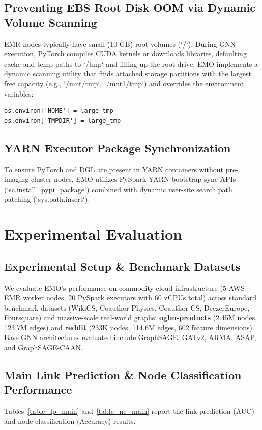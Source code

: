 \documentclass[conference,compsoc]{IEEEtran}
\begin{document}
\subsection{Preventing EBS Root Disk OOM via Dynamic Volume Scanning}
EMR nodes typically have small (10 GB) root volumes (`/`). During GNN execution, PyTorch compiles CUDA kernels or downloads libraries, defaulting cache and temp paths to `/tmp` and filling up the root drive. EMO implements a dynamic scanning utility that finds attached storage partitions with the largest free capacity (e.g., `/mnt/tmp`, `/mnt1/tmp`) and overrides the environment variables:
\begin{lstlisting}[basicstyle=\footnotesize\ttfamily,columns=fullflexible]
os.environ['HOME'] = large_tmp
os.environ['TMPDIR'] = large_tmp
\end{lstlisting}

\subsection{YARN Executor Package Synchronization}
To ensure PyTorch and DGL are present in YARN containers without pre-imaging cluster nodes, EMO utilizes PySpark YARN bootstrap sync APIs (`sc.install_pypi_package`) combined with dynamic user-site search path patching (`sys.path.insert`).

\section{Experimental Evaluation}
\subsection{Experimental Setup \& Benchmark Datasets}
We evaluate EMO's performance on commodity cloud infrastructure (5 AWS EMR worker nodes, 20 PySpark executors with 60 vCPUs total) across standard benchmark datasets (WikiCS, Coauthor-Physics, Coauthor-CS, DeezerEurope, Foursquare) and massive-scale real-world graphs: \textbf{ogbn-products} (2.45M nodes, 123.7M edges) and \textbf{reddit} (233K nodes, 114.6M edges, 602 feature dimensions). Base GNN architectures evaluated include GraphSAGE, GATv2, ARMA, ASAP, and GraphSAGE-CAAN.

\subsection{Main Link Prediction \& Node Classification Performance}
Tables~\ref{table_lp_main} and~\ref{table_nc_main} report the link prediction (AUC) and node classification (Accuracy) results.
\end{document}
